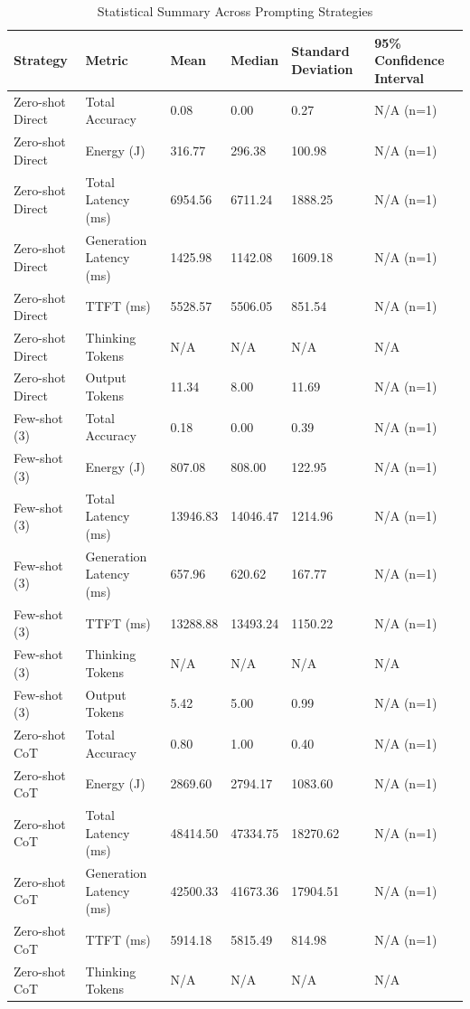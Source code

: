 \begin{table}
\caption{Statistical Summary Across Prompting Strategies}
\label{tab:statistical_summary}
\begin{tabular}{llllll}
\toprule
Strategy & Metric & Mean & Median & Standard Deviation & 95\% Confidence Interval \\
\midrule
Zero-shot Direct & Total Accuracy & 0.08 & 0.00 & 0.27 & N/A (n=1) \\
Zero-shot Direct & Energy (J) & 316.77 & 296.38 & 100.98 & N/A (n=1) \\
Zero-shot Direct & Total Latency (ms) & 6954.56 & 6711.24 & 1888.25 & N/A (n=1) \\
Zero-shot Direct & Generation Latency (ms) & 1425.98 & 1142.08 & 1609.18 & N/A (n=1) \\
Zero-shot Direct & TTFT (ms) & 5528.57 & 5506.05 & 851.54 & N/A (n=1) \\
Zero-shot Direct & Thinking Tokens & N/A & N/A & N/A & N/A \\
Zero-shot Direct & Output Tokens & 11.34 & 8.00 & 11.69 & N/A (n=1) \\
Few-shot (3) & Total Accuracy & 0.18 & 0.00 & 0.39 & N/A (n=1) \\
Few-shot (3) & Energy (J) & 807.08 & 808.00 & 122.95 & N/A (n=1) \\
Few-shot (3) & Total Latency (ms) & 13946.83 & 14046.47 & 1214.96 & N/A (n=1) \\
Few-shot (3) & Generation Latency (ms) & 657.96 & 620.62 & 167.77 & N/A (n=1) \\
Few-shot (3) & TTFT (ms) & 13288.88 & 13493.24 & 1150.22 & N/A (n=1) \\
Few-shot (3) & Thinking Tokens & N/A & N/A & N/A & N/A \\
Few-shot (3) & Output Tokens & 5.42 & 5.00 & 0.99 & N/A (n=1) \\
Zero-shot CoT & Total Accuracy & 0.80 & 1.00 & 0.40 & N/A (n=1) \\
Zero-shot CoT & Energy (J) & 2869.60 & 2794.17 & 1083.60 & N/A (n=1) \\
Zero-shot CoT & Total Latency (ms) & 48414.50 & 47334.75 & 18270.62 & N/A (n=1) \\
Zero-shot CoT & Generation Latency (ms) & 42500.33 & 41673.36 & 17904.51 & N/A (n=1) \\
Zero-shot CoT & TTFT (ms) & 5914.18 & 5815.49 & 814.98 & N/A (n=1) \\
Zero-shot CoT & Thinking Tokens & N/A & N/A & N/A & N/A \\

\end{tabular}
\end{table}
